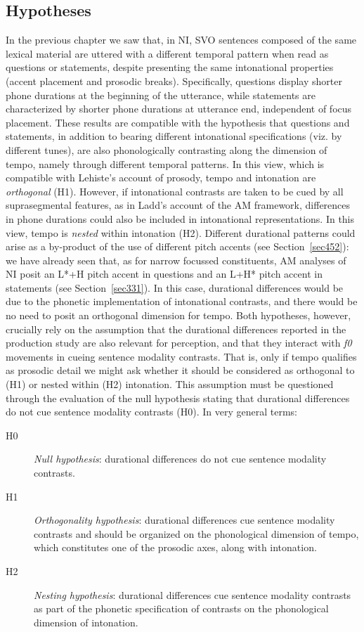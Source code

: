 \subsection{Hypotheses}\label{sec512}
In the previous chapter we saw that, in NI, SVO sentences composed of the same lexical material are uttered with a different temporal pattern when read as questions or statements, despite presenting the same intonational properties (accent placement and prosodic breaks). Specifically, questions display shorter phone durations at the beginning of the utterance, while statements are characterized by shorter phone durations at utterance end, independent of focus placement.
These results are compatible with the hypothesis that questions and statements, in addition to bearing different intonational specifications (viz. by different tunes), are also phonologically contrasting along the dimension of tempo, namely through different temporal patterns. In this view, which is compatible with Lehiste's account of prosody, tempo and intonation are \textit{orthogonal} (H1). However, if intonational contrasts are taken to be cued by all suprasegmental features, as in Ladd's account of the AM framework, differences in phone durations could also be included in intonational representations. In this view, tempo is \textit{nested} within intonation (H2). Different durational patterns could arise as a by-product of the use of different pitch accents (see Section~\ref{sec452}): we have already seen that, as for narrow focussed constituents, AM analyses of NI posit an L*+H pitch accent in questions and an L+H* pitch accent in statements (see Section~\ref{sec331}). In this case, durational differences would be due to the phonetic implementation of intonational contrasts, and there would be no need to posit an orthogonal dimension for tempo.
Both hypotheses, however, crucially rely on the assumption that the durational differences reported in the production study are also relevant for perception, and that they interact with \textit{f0} movements in cueing sentence modality contrasts. That is, only if tempo qualifies as prosodic detail we might ask whether it should be considered as orthogonal to (H1) or nested within (H2) intonation. This assumption must be questioned through the evaluation of the null hypothesis stating that durational differences do not cue sentence modality contrasts (H0). In very general terms:
\begin{description}
\item[H0] \textit{Null hypothesis}: durational differences do not cue sentence modality contrasts.
\item[H1] \textit{Orthogonality hypothesis}: durational differences cue sentence modality contrasts and should be organized on the phonological dimension of tempo, which constitutes one of the prosodic axes, along with intonation.
\item[H2] \textit{Nesting hypothesis}: durational differences cue sentence modality contrasts as part of the phonetic specification of contrasts on the phonological dimension of intonation.
\end{description}
